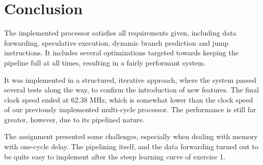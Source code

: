 \chapter{Conclusion}

The implemented processor satisfies all requirements given, including data forwarding, speculative execution, dynamic branch prediction and jump instructions.
It includes several optimizations targeted towards keeping the pipeline full at all times,
resulting in a fairly performant system.

It was implemented in a structured, iterative approach, where the system passed several tests along the way, to confirm the introduction of new features.
The final clock speed ended at 62.38 MHz, which is somewhat lower than the clock speed of our previously implemented multi-cycle processor.
The performance is still far greater, however, due to its pipelined nature.

The assignment presented some challenges, especially when dealing with memory with one-cycle delay.
The pipelining itself, and the data forwarding turned out to be quite easy to implement after the steep learning curve of exercise 1.
